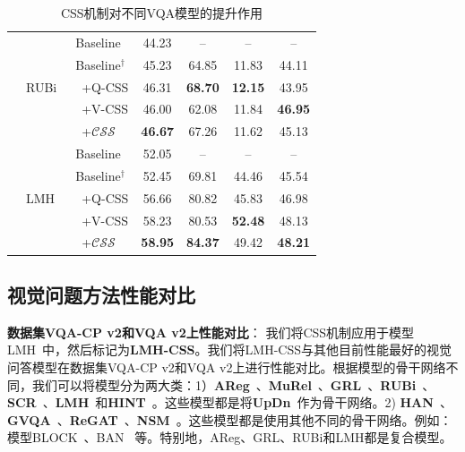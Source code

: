\begin{table}[tbp]
\begin{center}
{\begin{tabular}{|l | l | l | c c c c|}
                \cline{2-7}
                & \multirow{5}{*}{RUBi~\cite{cadene2019rubi}} & Baseline & 44.23 & -- & --  & -- \\
                & & Baseline$^\dagger$ & 45.23 & 64.85 & 11.83 & 44.11 \\
                & & ~+Q-CSS & 46.31 & \textbf{68.70} & \textbf{12.15} & 43.95 \\
                & & ~+V-CSS & 46.00 & 62.08 & 11.84 & \textbf{46.95} \\
                & & ~+$\mathcal{CSS}$ & \textbf{46.67} & 67.26 & 11.62 & 45.13 \\
                \cline{2-7}
                & \multirow{5}{*}{LMH~\cite{clark2019don}} & Baseline & 52.05 & -- & --  & -- \\
                & & Baseline$^\dagger$ & 52.45 & 69.81 & 44.46 & 45.54 \\
                & & ~+Q-CSS & 56.66 & 80.82 & 45.83 & 46.98 \\
                & & ~+V-CSS & 58.23 & 80.53 & \textbf{52.48} & 48.13 \\
                & & ~+$\mathcal{CSS}$ & \textbf{58.95} & \textbf{84.37} & 49.42 & \textbf{48.21} \\
                \hline
            \end{tabular}
        } %
    \end{center}
    \caption{CSS机制对不同VQA模型的提升作用}
    \label{ch7:tab:boost_models}
\end{table}

\subsection{视觉问题方法性能对比}

\textbf{数据集VQA-CP v2和VQA v2上性能对比}：
我们将CSS机制应用于模型LMH~\cite{clark2019don}中，然后标记为\textbf{LMH-CSS}。我们将LMH-CSS与其他目前性能最好的视觉问答模型在数据集VQA-CP v2和VQA v2上进行性能对比。根据模型的骨干网络不同，我们可以将模型分为两大类：1）\textbf{AReg}~\cite{ramakrishnan2018overcoming}、\textbf{MuRel}~\cite{cadene2019murel}、\textbf{GRL}~\cite{grand2019adversarial}、\textbf{RUBi}~\cite{cadene2019rubi}、\textbf{SCR}~\cite{wu2019self}、\textbf{LMH}~\cite{clark2019don}和\textbf{HINT}~\cite{selvaraju2019taking}。这些模型都是将\textbf{UpDn}~\cite{anderson2018bottom}作为骨干网络。2) \textbf{HAN}~\cite{malinowski2018learning}、\textbf{GVQA}~\cite{agrawal2018don}、\textbf{ReGAT}~\cite{li2019relation}、\textbf{NSM}~\cite{hudson2019learning}。这些模型都是使用其他不同的骨干网络。例如：模型BLOCK~\cite{ben2019block}、BAN~\cite{kim2018bilinear} 等。特别地，AReg、GRL、RUBi和LMH都是复合模型。

